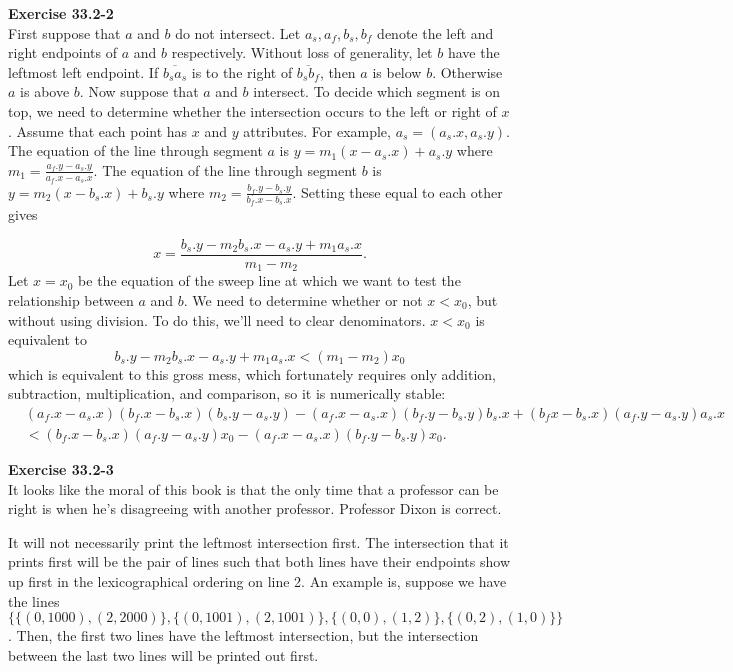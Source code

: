 \documentclass{article}
\begin{document}
\noindent\textbf{Exercise 33.2-2}\\

First suppose that $a$ and $b$ do not intersect.  Let $a_s, a_f, b_s, b_f$ denote the left and right endpoints of $a$ and $b$ respectively.  Without loss of generality, let $b$ have the leftmost left endpoint.  If $\overline{b_s a_s}$ is to the right of $\overline{b_s b_f}$, then $a$ is below $b$. Otherwise $a$ is above $b$.  Now suppose that $a$ and $b$ intersect.  To decide which segment is on top, we need to determine whether the intersection occurs to the left or right of $x$.  Assume that each point has $x$ and $y$ attributes.  For example, $a_s = (a_s.x, a_s.y)$.  The equation of the line through segment $a$ is $y = m_1(x-a_s.x) + a_s.y$ where $m_1 = \frac{a_f.y-a_s.y}{a_f.x-a_s.x}$.  The equation of the line through segment $b$ is $y = m_2(x-b_s.x) + b_s.y$ where $m_2 = \frac{b_f.y-b_s.y}{b_f.x-b_s.x}$.  Setting these equal to each other gives 

\[ x = \frac{b_s.y-m_2b_s.x - a_s.y + m_1 a_s.x}{m_1-m_2}.\]
Let $x = x_0$ be the equation of the sweep line at which we want to test the relationship between $a$ and $b$.  We need to determine whether or not $x < x_0$, but without using division.  To do this, we'll need to clear denominators.  $x < x_0$ is equivalent to 
\[b_s.y-m_2b_s.x - a_s.y + m_1 a_s.x < (m_1 - m_2)x_0\]
which is equivalent to this gross mess, which fortunately requires only addition, subtraction, multiplication, and comparison, so it is numerically stable:
\begin{align*}
&(a_f.x - a_s.x)(b_f.x-b_s.x)(b_s.y-a_s.y) - (a_f.x - a_s.x)(b_f.y-b_s.y)b_s.x + (b_fx-b_s.x)(a_f.y-a_s.y)a_s.x \\
&< (b_f.x-b_s.x)(a_f.y-a_s.y)x_0 - (a_f.x-a_s.x)(b_f.y-b_s.y)x_0.
\end{align*}


\noindent\textbf{Exercise 33.2-3}\\

It looks like the moral of this book is that the only time that a professor can be right is when he's disagreeing with another professor. Professor Dixon is correct.

It will not necessarily print the leftmost intersection first. The intersection that it prints first will be the pair of lines such that both lines have their endpoints show up first in the lexicographical ordering on line 2. An example is, suppose we have the lines $\{\{(0,1000),(2,2000)\},\{(0,1001),(2,1001)\},\{(0,0),(1,2)\},\{(0,2),(1,0)\}\}$. Then, the first two lines have the leftmost intersection, but the intersection between the last two lines will be printed out first.
\end{document}
